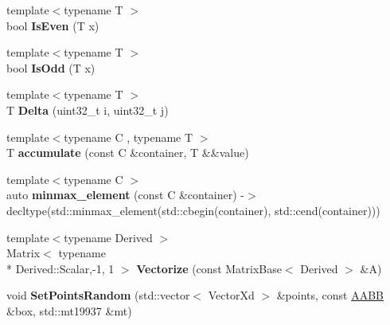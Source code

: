 \begin{DoxyCompactItemize}
\item 
\hypertarget{namespace_d_r_d_s_p_a415fff140e4195c2e7a4302766051864}{{\footnotesize template$<$typename T $>$ }\\bool {\bfseries Is\-Even} (T x)}\label{namespace_d_r_d_s_p_a415fff140e4195c2e7a4302766051864}

\item 
\hypertarget{namespace_d_r_d_s_p_abe0edfd6434cc15f79ab1815d13c2925}{{\footnotesize template$<$typename T $>$ }\\bool {\bfseries Is\-Odd} (T x)}\label{namespace_d_r_d_s_p_abe0edfd6434cc15f79ab1815d13c2925}

\item 
\hypertarget{namespace_d_r_d_s_p_a74155c7b3a7af163c966f6b5ed0e0c99}{{\footnotesize template$<$typename T $>$ }\\T {\bfseries Delta} (uint32\-\_\-t i, uint32\-\_\-t j)}\label{namespace_d_r_d_s_p_a74155c7b3a7af163c966f6b5ed0e0c99}

\item 
\hypertarget{namespace_d_r_d_s_p_a21ba4cb82daaae5682efe61c8fa176f7}{{\footnotesize template$<$typename C , typename T $>$ }\\T {\bfseries accumulate} (const C \&container, T \&\&value)}\label{namespace_d_r_d_s_p_a21ba4cb82daaae5682efe61c8fa176f7}

\item 
\hypertarget{namespace_d_r_d_s_p_a81df97d7847395b00eb91969cfaaf138}{{\footnotesize template$<$typename C $>$ }\\auto {\bfseries minmax\-\_\-element} (const C \&container) -\/$>$ decltype(std\-::minmax\-\_\-element(std\-::cbegin(container), std\-::cend(container)))}\label{namespace_d_r_d_s_p_a81df97d7847395b00eb91969cfaaf138}

\item 
\hypertarget{namespace_d_r_d_s_p_a9e0d9b1e83327e41a76366b4158f2813}{{\footnotesize template$<$typename Derived $>$ }\\Matrix$<$ typename \\*
Derived\-::\-Scalar,-\/1, 1 $>$ {\bfseries Vectorize} (const Matrix\-Base$<$ Derived $>$ \&A)}\label{namespace_d_r_d_s_p_a9e0d9b1e83327e41a76366b4158f2813}

\item 
\hypertarget{namespace_d_r_d_s_p_aed7e416be6e486d50e2fb2297f4e3cb7}{void {\bfseries Set\-Points\-Random} (std\-::vector$<$ Vector\-Xd $>$ \&points, const \hyperlink{struct_d_r_d_s_p_1_1_a_a_b_b}{A\-A\-B\-B} \&box, std\-::mt19937 \&mt)}\label{namespace_d_r_d_s_p_aed7e416be6e486d50e2fb2297f4e3cb7}


\end{DoxyCompactItemize}
